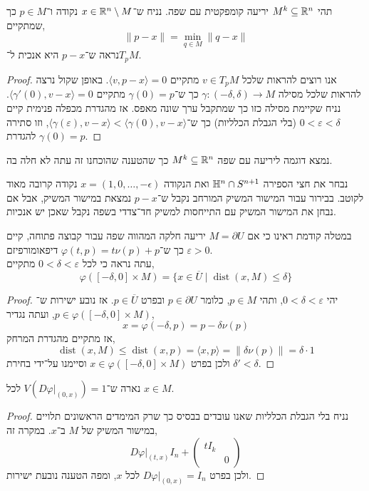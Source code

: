 \question[4]
\subquestion{}
תהי $M^k \subseteq \mathbb{R}^n$ יריעה קומפקטית עם שפה.
נניח ש־$x \in \mathbb{R}^n \setminus M$ נקודה ו־$p \in M$ כך שמתקיים,
\[
	\lVert p - x \rVert
	= \min_{q \in M} \lVert q - x \rVert
\]
נראה ש־$p - x$ היא אנכית ל־$T_p M$.
\begin{proof}
	אנו רוצים להראות שלכל $v \in T_p M$ מתקיים $\langle v, p - x \rangle = 0$.
	באופן שקול נרצה להראות שלכל מסילה $\gamma : (-\delta, \delta) \to M$ כך ש־$\gamma(0) = p$ מתקיים $\langle \gamma'(0), v - x \rangle = 0$.
	נניח שקיימת מסילה כזו כך שמתקבל ערך שונה מאפס.
	אז מהגדרת מכפלה פנימית קיים $0 < \varepsilon < \delta$ (בלי הגבלת הכלליות) כך ש־$\langle \gamma(\varepsilon), v - x \rangle < \langle \gamma(0), v - x \rangle$, וזו סתירה להגדרת $\gamma(0) = p$.
\end{proof}

\subquestion{}
נמצא דוגמה ליריעה עם שפה $M^k \subseteq \mathbb{R}^n$ כך שהטענה שהוכחנו זה עתה לא חלה בה.
\begin{solution}
	נבחר את חצי הספירה $\mathbb{H}^n \cap S^{n + 1}$ ואת הנקודה $x = (1, 0, \ldots, -\epsilon)$ נקודה קרובה מאוד לקוטב.
	בבירור עבור המישור המשיק המורחב נקבל ש־$p - x$ נמצאת במישור המשיק, אבל אם נבחן את המישור המשיק עם התייחסות למשיק חד־צדדי בשפה נקבל שאכן יש אנכיות.
\end{solution}

\subquestion{}
במטלה קודמת ראינו כי אם $M = \partial U$ יריעה חלקה המהווה שפה עבור קבוצה פתוחה, קיים $\varepsilon > 0$ כך ש־$\varphi(t, p) = t \nu(p) + p$ דיפאומורפיזם. \\
עתה נראה כי לכל $0 < \delta < \varepsilon$ מתקיים,
\[
	\varphi([-\delta, 0] \times M)
	= \{ x \in \overline{U} \mid \operatorname{dist}(x, M) \le \delta \}
\]
\begin{proof}
	יהי $0 < \delta < \varepsilon$, ותהי $p \in M$, כלומר $p \in \partial U$ ובפרט $p \in \overline{U}$.
	אז נובע ישירות ש־$p \in \varphi([-\delta, 0] \times M)$, ועתה נגדיר,
	\[
		x = \varphi(-\delta, p) = p - \delta \nu(p)
	\]
	אז מתקיים מהגדרת המרחק,
	\[
		\operatorname{dist}(x, M)
		\le \operatorname{dist}(x, p)
		= \langle x, p \rangle
		= \lVert \delta \nu(p) \rVert
		= \delta \cdot 1
	\]
	ולכן בפרט $x \in \varphi([-\delta, 0] \times M)$ וסיימנו על־ידי בחירת $\delta' < \delta$.
\end{proof}

\subquestion{}
נארה ש־$V(D \varphi |_{(0, x)}) = 1$ לכל $x \in M$.
\begin{proof}
	נניח בלי הגבלת הכלליות שאנו עובדים בבסיס כך שרק המימדים הראשונים תלויים במישור המשיק של $M$ ב־$x$.
	במקרה זה,
	\[
		D \varphi |_{(t, x)}
		I_n + \begin{pmatrix}
			t I_k &  \\
			 & 0
		\end{pmatrix} 
	\]
	ולכן בפרט $D \varphi |_{(0, x)} = I_n$ לכל $x$, ומפה הטענה נובעת ישירות.
\end{proof}

